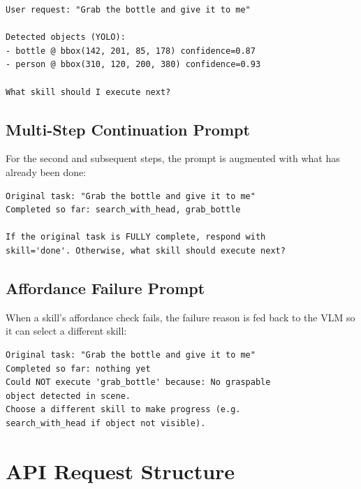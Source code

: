\begin{mdframed}[style=promptbox]
\small
\begin{verbatim}
User request: "Grab the bottle and give it to me"

Detected objects (YOLO):
- bottle @ bbox(142, 201, 85, 178) confidence=0.87
- person @ bbox(310, 120, 200, 380) confidence=0.93

What skill should I execute next?
\end{verbatim}
\end{mdframed}

\subsection{Multi-Step Continuation Prompt}

For the second and subsequent steps, the prompt is augmented with what has already
been done:

\begin{mdframed}[style=promptbox]
\small
\begin{verbatim}
Original task: "Grab the bottle and give it to me"
Completed so far: search_with_head, grab_bottle

If the original task is FULLY complete, respond with
skill='done'. Otherwise, what skill should execute next?
\end{verbatim}
\end{mdframed}

\subsection{Affordance Failure Prompt}

When a skill's affordance check fails, the failure reason is fed back to the VLM
so it can select a different skill:

\begin{mdframed}[style=promptbox]
\small
\begin{verbatim}
Original task: "Grab the bottle and give it to me"
Completed so far: nothing yet
Could NOT execute 'grab_bottle' because: No graspable
object detected in scene.
Choose a different skill to make progress (e.g.
search_with_head if object not visible).
\end{verbatim}
\end{mdframed}

\section{API Request Structure}


